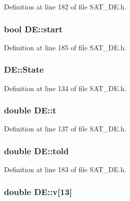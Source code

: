 Definition at line 182 of file S\-A\-T\-\_\-\-D\-E.\-h.

\hypertarget{classDE_a3c9b03623043eee0c38ecefecf301320}{
\subsubsection[{start}]{\setlength{\rightskip}{0pt plus 5cm}bool D\-E\-::start\hspace{0.3cm}{\ttfamily [private]}}}\label{classDE_a3c9b03623043eee0c38ecefecf301320}


Definition at line 185 of file S\-A\-T\-\_\-\-D\-E.\-h.

\hypertarget{classDE_a1d99a54650b09e8192bf89537f66bed2}{
\subsubsection[{State}]{ D\-E\-::\-State}}\label{classDE_a1d99a54650b09e8192bf89537f66bed2}


Definition at line 134 of file S\-A\-T\-\_\-\-D\-E.\-h.

\hypertarget{classDE_a56ee5af65170db9321a5508c207cd173}{
\subsubsection[{t}]{\setlength{\rightskip}{0pt plus 5cm}double D\-E\-::t}}\label{classDE_a56ee5af65170db9321a5508c207cd173}


Definition at line 137 of file S\-A\-T\-\_\-\-D\-E.\-h.

\hypertarget{classDE_a710c5e85925a2ce84f8d789c1b4cb99b}{
\subsubsection[{told}]{\setlength{\rightskip}{0pt plus 5cm}double D\-E\-::told\hspace{0.3cm}{\ttfamily [private]}}}\label{classDE_a710c5e85925a2ce84f8d789c1b4cb99b}


Definition at line 183 of file S\-A\-T\-\_\-\-D\-E.\-h.

\hypertarget{classDE_af4b92bb3bf10322b581dbbcf778ef5d5}{
\subsubsection[{v}]{\setlength{\rightskip}{0pt plus 5cm}double D\-E\-::v\mbox{[}13\mbox{]}\hspace{0.3cm}{\ttfamily [private]}}}\label{classDE_af4b92bb3bf10322b581dbbcf778ef5d5}


